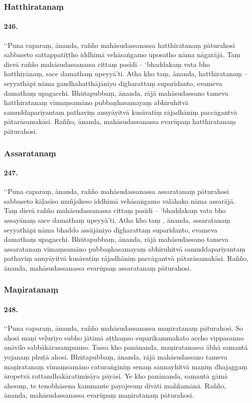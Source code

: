 \subsubsection{Hatthiratanaṃ}

\paragraph{246.} ‘‘Puna caparaṃ, ānanda, rañño mahāsudassanassa hatthiratanaṃ pāturahosi sabbaseto sattappatiṭṭho iddhimā vehāsaṅgamo uposatho nāma nāgarājā. Taṃ disvā rañño mahāsudassanassa cittaṃ pasīdi – ‘bhaddakaṃ vata bho hatthiyānaṃ, sace damathaṃ upeyyā’ti. Atha kho taṃ, ānanda, hatthiratanaṃ – seyyathāpi nāma gandhahatthājāniyo dīgharattaṃ suparidanto, evameva damathaṃ upagacchi. Bhūtapubbaṃ, ānanda, rājā mahāsudassano tameva hatthiratanaṃ vīmaṃsamāno pubbaṇhasamayaṃ abhiruhitvā samuddapariyantaṃ pathaviṃ anuyāyitvā kusāvatiṃ rājadhāniṃ paccāgantvā pātarāsamakāsi. Rañño, ānanda, mahāsudassanassa evarūpaṃ hatthiratanaṃ pāturahosi.

\subsubsection{Assaratanaṃ}

\paragraph{247.} ‘‘Puna caparaṃ, ānanda, rañño mahāsudassanassa assaratanaṃ pāturahosi sabbaseto kāḷasīso muñjakeso iddhimā vehāsaṅgamo valāhako nāma assarājā. Taṃ disvā rañño mahāsudassanassa cittaṃ pasīdi – ‘bhaddakaṃ vata bho assayānaṃ sace damathaṃ upeyyā’ti. Atha kho taṃ , ānanda, assaratanaṃ seyyathāpi nāma bhaddo assājāniyo dīgharattaṃ suparidanto, evameva damathaṃ upagacchi. Bhūtapubbaṃ, ānanda, rājā mahāsudassano tameva assaratanaṃ vīmaṃsamāno pubbaṇhasamayaṃ abhiruhitvā samuddapariyantaṃ pathaviṃ anuyāyitvā kusāvatiṃ rājadhāniṃ paccāgantvā pātarāsamakāsi. Rañño, ānanda, mahāsudassanassa evarūpaṃ assaratanaṃ pāturahosi.

\subsubsection{Maṇiratanaṃ}

\paragraph{248.} ‘‘Puna caparaṃ, ānanda, rañño mahāsudassanassa maṇiratanaṃ pāturahosi. So ahosi maṇi veḷuriyo subho jātimā aṭṭhaṃso suparikammakato accho vippasanno anāvilo sabbākārasampanno. Tassa kho panānanda, maṇiratanassa ābhā samantā yojanaṃ phuṭā ahosi. Bhūtapubbaṃ, ānanda, rājā mahāsudassano tameva maṇiratanaṃ vīmaṃsamāno caturaṅginiṃ senaṃ sannayhitvā maṇiṃ dhajaggaṃ āropetvā rattandhakāratimisāya pāyāsi. Ye kho panānanda, samantā gāmā ahesuṃ, te tenobhāsena kammante payojesuṃ divāti maññamānā. Rañño, ānanda, mahāsudassanassa evarūpaṃ maṇiratanaṃ pāturahosi.

